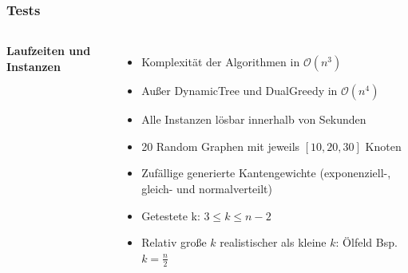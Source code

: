 \documentclass[aspectratio=169]{beamer}
\begin{document}
\begin{frame}
	\frametitle{Tests}
	\begin{columns}[c] %
		
		\textbf{Laufzeiten und Instanzen}
		\begin{itemize}
			\item Komplexität der Algorithmen in  $\mathcal{O}(n^3)$
			\item Außer DynamicTree und DualGreedy in $\mathcal{O}(n^4)$
			\item Alle Instanzen lösbar innerhalb von Sekunden
			\item 20 Random Graphen mit jeweils $[10,20,30]$ Knoten
			\item Zufällige generierte Kantengewichte (exponenziell-, gleich- und normalverteilt) 
			\item Getestete k: $3 \leq k \leq n-2$
			\item Relativ große $k$ realistischer als kleine $k$: Ölfeld Bsp. $k= \frac{n}{2}$
		\end{itemize}
		
		
		
	\end{columns}
	\end{frame}
\end{document}
